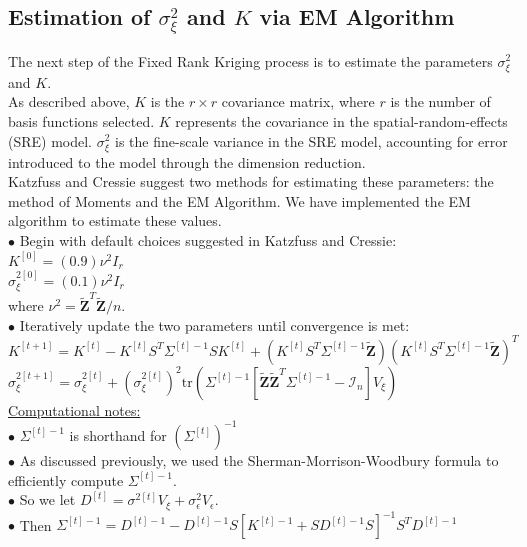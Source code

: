 \documentclass[11pt]{article}
\newcommand{\myindent}{\hspace*{1cm}}
\begin{document}
\subsection{Estimation of $\sigma^2_{\xi}$ and $K$ via EM Algorithm}

The next step of the Fixed Rank Kriging process is to estimate the parameters $\sigma^2_{\xi}$ and $K$.  \\

As described above, $K$ is the $r \times r$ covariance matrix, where $r$ is the number of basis functions selected.  $K$ represents the covariance in the spatial-random-effects (SRE) model. $\sigma^2_{\xi}$ is the fine-scale variance in the SRE model, accounting for error introduced to the model through the dimension reduction. \\

Katzfuss and Cressie suggest two methods for estimating these parameters: the method of Moments and the EM Algorithm.  We have implemented the EM algorithm to estimate these values.\\

\myindent $\bullet$ Begin with default choices suggested in Katzfuss and Cressie: \\

\myindent \myindent $K^{[0]} = (0.9)\nu ^2 I_r$ \\
\myindent \myindent $\sigma_\xi^{2[0]} = (0.1)\nu ^2 I_r$ \\
\myindent \myindent \myindent where $\nu^2 = \tilde{\bm{Z}}^T\tilde{\bm{Z}}/n$.\\

\myindent $\bullet$ Iteratively update the two parameters until convergence is met:\\

\myindent \myindent $K^{[t+1]} = K^{[t]} - K^{[t]} S^T \Sigma^{[t]-1}SK^{[t]}
  + \left(K^{[t]}S^T \Sigma^{[t]-1} \tilde{\bm{Z}} \right)\left(K^{[t]}S^T \Sigma^{[t]-1} \tilde{\bm{Z}} \right)^T$ \\
\myindent \myindent $\sigma_\xi^{2[t+1]} = \sigma_\xi^{2[t]} + \left(\sigma_\xi^{2[t]} \right)^2 \text{tr} \left(\Sigma^{[t]-1}[\tilde{\bm{Z}}\tilde{\bm{Z}}^T\Sigma^{[t]-1} - \mathcal{I}_n]V_\xi \right)$\\

\underline{Computational notes:} \\
\myindent $\bullet$ $\Sigma^{[t]-1}$ is shorthand for $(\Sigma^{[t]})^{-1}$ \\
\myindent $\bullet$ As discussed previously, we used the Sherman-Morrison-Woodbury formula to  \\ \myindent \myindent efficiently compute $\Sigma^{[t]-1}$.\\
\myindent $\bullet$ So we let $D^{[t]} = \sigma^{2[t]}V_\xi + \sigma^2_\epsilon V_\epsilon$. \\
\myindent $\bullet$ Then $\Sigma^{[t]-1} = D^{[t]-1} -  D^{[t]-1}S[K^{[t]-1} + SD^{[t]-1}S]^{-1}S^TD^{[t]-1}$\\
\end{document}
